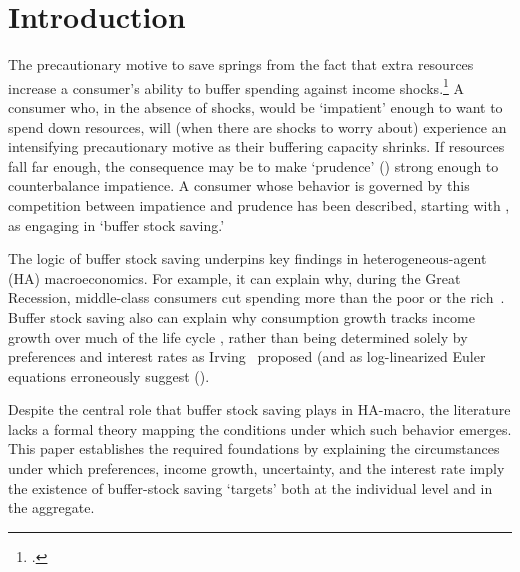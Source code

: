 \documentclass[BufferStockTheory]{subfiles}
\begin{document}
\hypersetup{pageanchor=true}  %

\pagebreak
\hypertarget{Introduction}{}
\section{Introduction}\label{sec:intro}
\setcounter{page}{0}

The precautionary motive to save springs from the fact that extra resources increase a consumer's ability to buffer spending against income shocks.\footnote{\cite{CarrollKimballPSPW}.}  A consumer who, in the absence of shocks, would be `impatient' enough to want to spend down resources, will (when there are shocks to worry about) experience an intensifying precautionary motive as their buffering capacity shrinks.
If resources fall far enough, the consequence may be to make `prudence' (\cite{kimball:standardra}) strong enough to counterbalance impatience.
A consumer whose behavior is governed by this competition between impatience and prudence has been described, starting with \cite{deatonLiqConstr}, as engaging in `buffer stock saving.'


The logic of buffer stock saving underpins key findings in heterogeneous-agent (HA) macroeconomics.
For example, it can explain why, during the Great Recession, middle-class consumers cut spending more than the poor or the rich~\citep{kmpHandbook}.
Buffer stock saving also can explain why consumption growth tracks income growth over much of the life cycle \citep{carrollBSLCPIH}, rather than being determined solely by preferences and interest rates as Irving~\cite{fisherInterestTheory} proposed (and as log-linearized Euler equations erroneously suggest (\cite{carroll:death}).


Despite the central role that buffer stock saving plays in HA-macro, the literature lacks a formal theory mapping the conditions under which such behavior emerges.
This paper establishes the required foundations by explaining the circumstances under which preferences, income growth, uncertainty, and the interest rate imply the existence of buffer-stock saving `targets' both at the individual level and in the aggregate.
\end{document}
